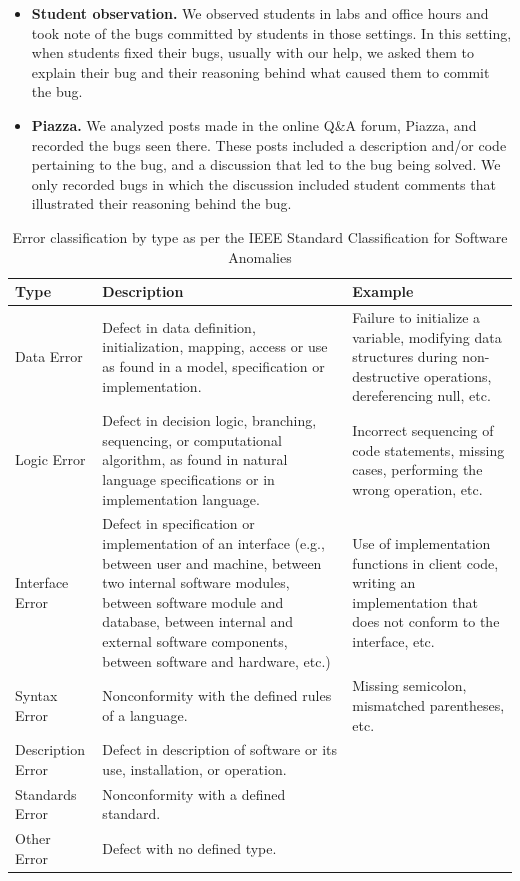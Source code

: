 \documentclass[11pt,letterpaper]{article}
\begin{document}
\begin{itemize}
\item{\textbf{Student observation.} We observed students in labs and office hours and took note of the bugs committed by students in those settings. In this setting, when students fixed their bugs, usually with our help, we asked them to explain their bug and their reasoning behind what caused them to commit the bug.}
\item{\textbf{Piazza.} We analyzed posts made in the online Q\&A forum, Piazza, and recorded the bugs seen there. These posts included a description and/or code pertaining to the bug, and a discussion that led to the bug being solved. We only recorded bugs in which the discussion included student comments that illustrated their reasoning behind the bug.}
\end{itemize}

\begin{table}
\def\arraystretch{1.75}
\centering
\caption{Error classification by type as per the IEEE Standard Classification for Software Anomalies \cite{IEEE10}}
\label{table:IEEE}
\begin{tabular}{|p{1in}|p{3in}|p{2.4in}|} \hline
\textbf{Type} & \textbf{Description} & \textbf{Example}\\ \hline
Data Error&
Defect in data definition, initialization, mapping, access or use as found in a model, specification or implementation.&
Failure to initialize a variable, modifying data structures during non-destructive operations, dereferencing null, etc.\\ \hline

Logic Error&
Defect in decision logic, branching, sequencing, or computational algorithm, as found in natural language specifications or in
implementation language.&
Incorrect sequencing of code statements, missing cases, performing the wrong operation, etc.\\ \hline

Interface Error&
Defect in specification or implementation of an interface (e.g., between user and machine, between two internal software modules, between software module and database, between internal and external software components, between software and hardware, etc.)&
Use of implementation functions in client code, writing an implementation that does not conform to the interface, etc.\\ \hline

Syntax Error&
Nonconformity with the defined rules of a language.&
Missing semicolon, mismatched parentheses, etc.\\ \hline

Description Error&
Defect in description of software or its use, installation, or operation.&
\\ \hline

Standards Error&
Nonconformity with a defined standard.&
\\ \hline

Other Error&
Defect with no defined type.
&
\\ \hline
\end{tabular}
\end{table}
\end{document}
